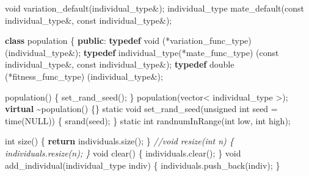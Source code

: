 \documentclass[
]{article}
\newenvironment{Shaded}{}{}
\newcommand{\AttributeTok}[1]{\textcolor[rgb]{0.49,0.56,0.16}{#1}}
\newcommand{\CommentTok}[1]{\textcolor[rgb]{0.38,0.63,0.69}{\textit{#1}}}
\newcommand{\ControlFlowTok}[1]{\textcolor[rgb]{0.00,0.44,0.13}{\textbf{#1}}}
\newcommand{\DataTypeTok}[1]{\textcolor[rgb]{0.56,0.13,0.00}{#1}}
\newcommand{\KeywordTok}[1]{\textcolor[rgb]{0.00,0.44,0.13}{\textbf{#1}}}
\newcommand{\NormalTok}[1]{#1}
\newcommand{\OperatorTok}[1]{\textcolor[rgb]{0.40,0.40,0.40}{#1}}
\begin{document}
\begin{Shaded}
\begin{Highlighting}[]
\DataTypeTok{void}\NormalTok{ variation\_default}\OperatorTok{(}\DataTypeTok{individual\_type}\OperatorTok{\&);}
\DataTypeTok{individual\_type}\NormalTok{ mate\_default}\OperatorTok{(}\AttributeTok{const} \DataTypeTok{individual\_type}\OperatorTok{\&,} \AttributeTok{const} \DataTypeTok{individual\_type}\OperatorTok{\&);}

\KeywordTok{class}\NormalTok{ population }\OperatorTok{\{}
\KeywordTok{public}\OperatorTok{:}
	\KeywordTok{typedef} \DataTypeTok{void} \OperatorTok{(*}\DataTypeTok{variation\_func\_type}\OperatorTok{)} \OperatorTok{(}\DataTypeTok{individual\_type}\OperatorTok{\&);}
	\KeywordTok{typedef} \DataTypeTok{individual\_type}\OperatorTok{(*}\DataTypeTok{mate\_func\_type}\OperatorTok{)} \OperatorTok{(}\AttributeTok{const} \DataTypeTok{individual\_type}\OperatorTok{\&,} \AttributeTok{const} \DataTypeTok{individual\_type}\OperatorTok{\&);}
	\KeywordTok{typedef} \DataTypeTok{double} \OperatorTok{(*}\DataTypeTok{fitness\_func\_type}\OperatorTok{)} \OperatorTok{(}\DataTypeTok{individual\_type}\OperatorTok{\&);}

\NormalTok{	population}\OperatorTok{()} \OperatorTok{\{}\NormalTok{ set\_rand\_seed}\OperatorTok{();} \OperatorTok{\}}
\NormalTok{	population}\OperatorTok{(}\NormalTok{vector}\OperatorTok{\textless{}} \DataTypeTok{individual\_type} \OperatorTok{\textgreater{});}
	\KeywordTok{virtual} \OperatorTok{\textasciitilde{}}\NormalTok{population}\OperatorTok{()} \OperatorTok{\{\}}
	\AttributeTok{static} \DataTypeTok{void}\NormalTok{ set\_rand\_seed}\OperatorTok{(}\DataTypeTok{unsigned} \DataTypeTok{int}\NormalTok{ seed }\OperatorTok{=}\NormalTok{ time}\OperatorTok{(}\NormalTok{NULL}\OperatorTok{))} \OperatorTok{\{}\NormalTok{ srand}\OperatorTok{(}\NormalTok{seed}\OperatorTok{);} \OperatorTok{\}}
	\AttributeTok{static} \DataTypeTok{int}\NormalTok{ randnumInRange}\OperatorTok{(}\DataTypeTok{int}\NormalTok{ low}\OperatorTok{,} \DataTypeTok{int}\NormalTok{ high}\OperatorTok{);}

	\DataTypeTok{int}\NormalTok{ size}\OperatorTok{()} \OperatorTok{\{} \ControlFlowTok{return}\NormalTok{ individuals}\OperatorTok{.}\NormalTok{size}\OperatorTok{();} \OperatorTok{\}}
	\CommentTok{//void resize(int n) \{ individuals.resize(n); \}}
	\DataTypeTok{void}\NormalTok{ clear}\OperatorTok{()} \OperatorTok{\{}\NormalTok{ individuals}\OperatorTok{.}\NormalTok{clear}\OperatorTok{();} \OperatorTok{\}}
	\DataTypeTok{void}\NormalTok{ add\_individual}\OperatorTok{(}\DataTypeTok{individual\_type}\NormalTok{ indiv}\OperatorTok{)} \OperatorTok{\{}\NormalTok{ individuals}\OperatorTok{.}\NormalTok{push\_back}\OperatorTok{(}\NormalTok{indiv}\OperatorTok{);} \OperatorTok{\}}


\end{Highlighting}
\end{Shaded}
\end{document}
